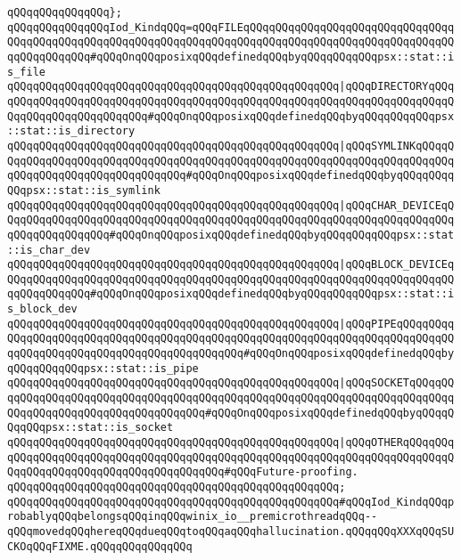 \verb|qQQqqQQqqQQqqQQq};|\newline
\newline
\verb|qQQqqQQqqQQqqQQqIod_KindqQQq=qQQqFILEqQQqqQQqqQQqqQQqqQQqqQQqqQQqqQQqqQQqqQQqqQQqqQQqqQQqqQQqqQQqqQQqqQQqqQQqqQQqqQQqqQQqqQQqqQQqqQQqqQQqqQQqqQQqqQQqqQQq#qQQqOnqQQqposixqQQqdefinedqQQqbyqQQqqQQqqQQqpsx::stat::is_file|\newline
\verb|qQQqqQQqqQQqqQQqqQQqqQQqqQQqqQQqqQQqqQQqqQQqqQQqqQQq|\verb#|qQQqDIRECTORYqQQqqQQqqQQqqQQqqQQqqQQqqQQqqQQqqQQqqQQqqQQqqQQqqQQqqQQqqQQqqQQqqQQqqQQqqQQqqQQqqQQqqQQqqQQqqQQq#\verb|#qQQqOnqQQqposixqQQqdefinedqQQqbyqQQqqQQqqQQqpsx::stat::is_directory|\newline
\verb|qQQqqQQqqQQqqQQqqQQqqQQqqQQqqQQqqQQqqQQqqQQqqQQqqQQq|\verb#|qQQqSYMLINKqQQqqQQqqQQqqQQqqQQqqQQqqQQqqQQqqQQqqQQqqQQqqQQqqQQqqQQqqQQqqQQqqQQqqQQqqQQqqQQqqQQqqQQqqQQqqQQqqQQqqQQq#\verb|#qQQqOnqQQqposixqQQqdefinedqQQqbyqQQqqQQqqQQqpsx::stat::is_symlink|\newline
\verb|qQQqqQQqqQQqqQQqqQQqqQQqqQQqqQQqqQQqqQQqqQQqqQQqqQQq|\verb#|qQQqCHAR_DEVICEqQQqqQQqqQQqqQQqqQQqqQQqqQQqqQQqqQQqqQQqqQQqqQQqqQQqqQQqqQQqqQQqqQQqqQQqqQQqqQQqqQQqqQQq#\verb|#qQQqOnqQQqposixqQQqdefinedqQQqbyqQQqqQQqqQQqpsx::stat::is_char_dev|\newline
\verb|qQQqqQQqqQQqqQQqqQQqqQQqqQQqqQQqqQQqqQQqqQQqqQQqqQQq|\verb#|qQQqBLOCK_DEVICEqQQqqQQqqQQqqQQqqQQqqQQqqQQqqQQqqQQqqQQqqQQqqQQqqQQqqQQqqQQqqQQqqQQqqQQqqQQqqQQqqQQq#\verb|#qQQqOnqQQqposixqQQqdefinedqQQqbyqQQqqQQqqQQqpsx::stat::is_block_dev|\newline
\verb|qQQqqQQqqQQqqQQqqQQqqQQqqQQqqQQqqQQqqQQqqQQqqQQqqQQq|\verb#|qQQqPIPEqQQqqQQqqQQqqQQqqQQqqQQqqQQqqQQqqQQqqQQqqQQqqQQqqQQqqQQqqQQqqQQqqQQqqQQqqQQqqQQqqQQqqQQqqQQqqQQqqQQqqQQqqQQqqQQqqQQq#\verb|#qQQqOnqQQqposixqQQqdefinedqQQqbyqQQqqQQqqQQqpsx::stat::is_pipe|\newline
\verb|qQQqqQQqqQQqqQQqqQQqqQQqqQQqqQQqqQQqqQQqqQQqqQQqqQQq|\verb#|qQQqSOCKETqQQqqQQqqQQqqQQqqQQqqQQqqQQqqQQqqQQqqQQqqQQqqQQqqQQqqQQqqQQqqQQqqQQqqQQqqQQqqQQqqQQqqQQqqQQqqQQqqQQqqQQqqQQq#\verb|#qQQqOnqQQqposixqQQqdefinedqQQqbyqQQqqQQqqQQqpsx::stat::is_socket|\newline
\verb|qQQqqQQqqQQqqQQqqQQqqQQqqQQqqQQqqQQqqQQqqQQqqQQqqQQq|\verb#|qQQqOTHERqQQqqQQqqQQqqQQqqQQqqQQqqQQqqQQqqQQqqQQqqQQqqQQqqQQqqQQqqQQqqQQqqQQqqQQqqQQqqQQqqQQqqQQqqQQqqQQqqQQqqQQqqQQqqQQq#\verb|#qQQqFuture-proofing.|\newline
\verb|qQQqqQQqqQQqqQQqqQQqqQQqqQQqqQQqqQQqqQQqqQQqqQQqqQQq;|\newline
\verb|qQQqqQQqqQQqqQQqqQQqqQQqqQQqqQQqqQQqqQQqqQQqqQQqqQQq#qQQqIod_KindqQQqprobablyqQQqbelongsqQQqinqQQqwinix_io__premicrothreadqQQq--qQQqmovedqQQqhereqQQqdueqQQqtoqQQqaqQQqhallucination.qQQqqQQqXXXqQQqSUCKOqQQqFIXME.qQQqqQQqqQQqqQQq|\newline
